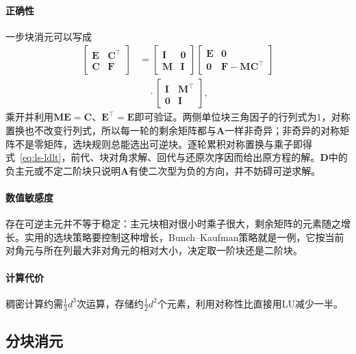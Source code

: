 \paragraph{正确性}
一步块消元可以写成
\[
\begin{aligned}
 \begin{bmatrix}\bm E&\bm C^\top\\\bm C&\bm F\end{bmatrix}
 &=\begin{bmatrix}\bm I&\bm0\\\bm M&\bm I\end{bmatrix}
 \begin{bmatrix}\bm E&\bm0\\\bm0&\bm F-\bm M\bm C^\top\end{bmatrix}\\
 &\quad\cdot\begin{bmatrix}\bm I&\bm M^\top\\\bm0&\bm I\end{bmatrix},
\end{aligned}
\]
乘开并利用$\bm M\bm E=\bm C$、$\bm E^\top=\bm E$即可验证。两侧单位块三角因子的行列式为$1$，对称置换也不改变行列式，所以每一轮的剩余矩阵都与$\bm A$一样非奇异；非奇异的对称矩阵不是零矩阵，选块规则总能选出可逆块。逐轮累积对称置换与乘子即得式~\eqref{eq:ls-ldlt}，前代、块对角求解、回代与还原次序因而给出原方程的解。$\bm D$中的负主元或不定二阶块只说明$\bm A$有使二次型为负的方向，并不妨碍可逆求解。

\paragraph{数值敏感度}
存在可逆主元并不等于稳定：主元块相对很小时乘子很大，剩余矩阵的元素随之增长。实用的选块策略要控制这种增长，Bunch--Kaufman策略就是一例，它按当前对角元与所在列最大非对角元的相对大小，决定取一阶块还是二阶块。

\paragraph{计算代价}
稠密计算约需$\tfrac13d^3$次运算，存储约$\tfrac12d^2$个元素，利用对称性比直接用LU减少一半。

\subsection{分块消元}
\label{sec:ls-block-elimination}

